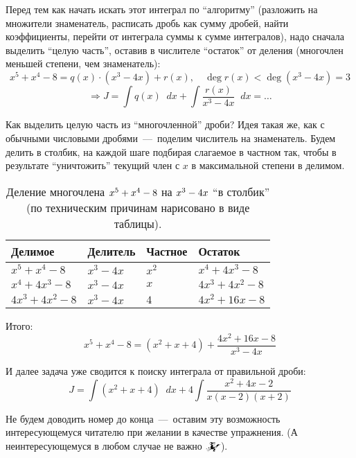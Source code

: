 \documentclass[a4paper,12pt]{article}
\newcommand{\diff}{\mathop{}\!d}
\begin{document}
  \begin{solution}
    Перед тем как начать искать этот интеграл по ``алгоритму'' (разложить на множители знаменатель, расписать дробь как сумму дробей, найти коэффициенты, перейти от интеграла суммы к сумме интегралов), надо сначала выделить ``целую часть'', оставив в числителе ``остаток'' от деления (многочлен меньшей степени, чем знаменатель):
    \[
      x^5 + x^4 - 8 = q(x) \cdot (x^3 - 4x) + r(x),\quad \deg r(x) < \deg(x^3 - 4x) = 3
    \]
    \[
      \Rightarrow J = \int q(x) \diff x + \int \frac{r(x)}{x^3 - 4x} \diff x = \ldots
    \]

    Как выделить целую часть из ``многочленной'' дроби?
    Идея такая же, как с обычными числовыми дробями~---~поделим числитель на знаменатель.
    Будем делить в столбик, на каждой шаге подбирая слагаемое в частном так, чтобы в результате ``уничтожить'' текущий член с $x$ в максимальной степени в делимом.
    \begin{table}[ht]
        \centering
        
        \caption{Деление многочлена $x^5 \hm+ x^4 \hm- 8$ на $x^3 \hm- 4x$ ``в столбик'' (по техническим причинам нарисовано в виде таблицы).}
        \label{tab:my_label}
        
        \begin{tabular}{l|l|l|l}
             \toprule
             Делимое           & Делитель   & Частное & Остаток\\
             \midrule
             $x^5 + x^4 - 8$   & $x^3 - 4x$ & $x^2$   & $x^4 + 4x^3 - 8$\\
             $x^4 + 4x^3 - 8$  & $x^3 - 4x$ & $x$     & $4x^3 + 4x^2 - 8$\\
             $4x^3 + 4x^2 - 8$ & $x^3 - 4x$ & $4$     & $4x^2 + 16x - 8$\\
             \bottomrule
        \end{tabular}
    \end{table}

    Итого:
    \[
      x^5 + x^4 - 8 = (x^2 + x + 4) + \frac{4x^2 + 16x - 8}{x^3 - 4x}
    \]

    И далее задача уже сводится к поиску интеграла от правильной дроби:
    \[
      J = \int (x^2 + x + 4) \diff x + 4 \int \frac{x^2 + 4x - 2}{x(x - 2)(x + 2)}
    \]

    Не будем доводить номер до конца~---~оставим эту возможность интересующемуся читателю при желании в качестве упражнения.
    (А неинтересующемуся в любом случае не важно $\mathwitch*$).
  \end{solution}
\end{document}
